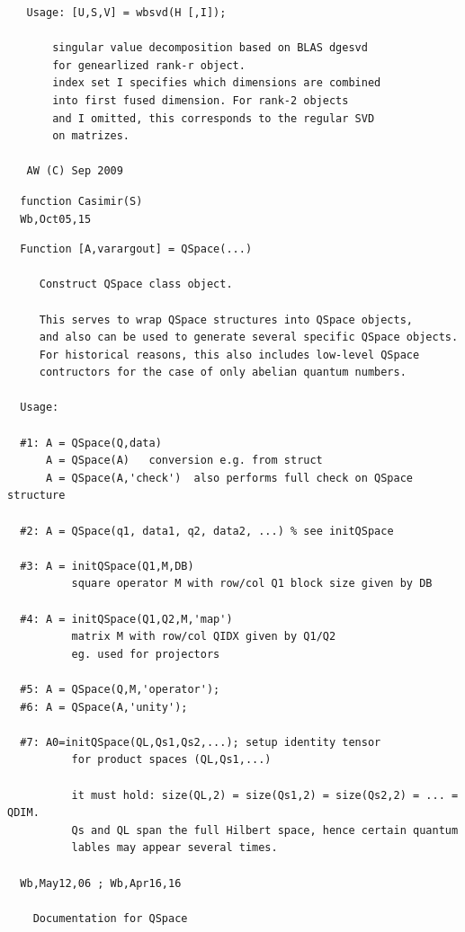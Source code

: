 \documentclass[twoside,12pt]{article}
\begin{document}
\pagebreak[3]



\begin{verbatim}
   Usage: [U,S,V] = wbsvd(H [,I]);
 
       singular value decomposition based on BLAS dgesvd
       for genearlized rank-r object.
       index set I specifies which dimensions are combined
       into first fused dimension. For rank-2 objects
       and I omitted, this corresponds to the regular SVD
       on matrizes.
 
   AW (C) Sep 2009
\end{verbatim}

\newpage




\pagebreak[3]



\begin{verbatim}
  function Casimir(S)
  Wb,Oct05,15
\end{verbatim}

\pagebreak[3]



\begin{verbatim}
  Function [A,varargout] = QSpace(...)
 
     Construct QSpace class object.
 
     This serves to wrap QSpace structures into QSpace objects,
     and also can be used to generate several specific QSpace objects.
     For historical reasons, this also includes low-level QSpace
     contructors for the case of only abelian quantum numbers.
 
  Usage:
 
  #1: A = QSpace(Q,data)
      A = QSpace(A)   conversion e.g. from struct
      A = QSpace(A,'check')  also performs full check on QSpace structure
 
  #2: A = QSpace(q1, data1, q2, data2, ...) % see initQSpace
 
  #3: A = initQSpace(Q1,M,DB)
          square operator M with row/col Q1 block size given by DB
 
  #4: A = initQSpace(Q1,Q2,M,'map')
          matrix M with row/col QIDX given by Q1/Q2
          eg. used for projectors
 
  #5: A = QSpace(Q,M,'operator');
  #6: A = QSpace(A,'unity');
 
  #7: A0=initQSpace(QL,Qs1,Qs2,...); setup identity tensor
          for product spaces (QL,Qs1,...)
   
          it must hold: size(QL,2) = size(Qs1,2) = size(Qs2,2) = ... = QDIM.
          Qs and QL span the full Hilbert space, hence certain quantum
          lables may appear several times.
 
  Wb,May12,06 ; Wb,Apr16,16

    Documentation for QSpace
\end{verbatim}
\end{document}
